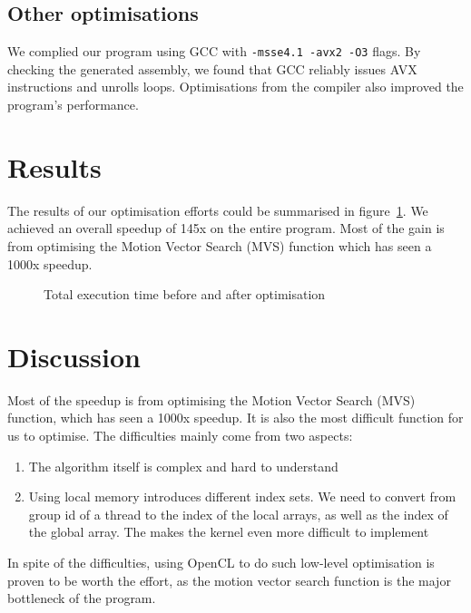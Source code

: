 \documentclass[a4paper]{article}
\begin{document}
\subsection{Other optimisations}
We complied our program using GCC with \verb|-msse4.1 -avx2 -O3|
flags. By checking the generated assembly, we found that GCC 
reliably issues AVX instructions and unrolls loops.
Optimisations from the compiler also improved the program's
performance.

\section{Results}
The results of our optimisation efforts could be summarised in
figure~\ref{fig:before_after_bar}. We achieved an overall speedup of
145x on the entire program. Most of the gain is from optimising the
Motion Vector Search (MVS) function which has seen a 1000x speedup.
\begin{figure}[h]
  \centering
  \caption{Total execution time before and after optimisation}
  \label{fig:before_after_bar}
\end{figure}

\section{Discussion}
Most of the speedup is from optimising the Motion Vector Search (MVS)
function, which has seen a 1000x speedup. It is also the most difficult
function for us to optimise. The difficulties mainly come from two
aspects:
\begin{enumerate}
\item The algorithm itself is complex and hard to understand
\item Using local memory introduces different index sets. We need to
  convert from group id of a thread to the index of the local arrays,
  as well as the index of the global array. The makes the kernel even
  more difficult to implement
\end{enumerate}

In spite of the difficulties, using OpenCL to do such low-level
optimisation is proven to be worth the effort, as the motion vector search function is the
major bottleneck of the program.
\end{document}
